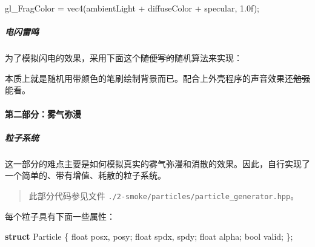 \documentclass[
]{article}
\newenvironment{Shaded}{}{}
\newcommand{\BuiltInTok}[1]{#1}
\newcommand{\CommentTok}[1]{\textcolor[rgb]{0.38,0.63,0.69}{\textit{#1}}}
\newcommand{\ControlFlowTok}[1]{\textcolor[rgb]{0.00,0.44,0.13}{\textbf{#1}}}
\newcommand{\DataTypeTok}[1]{\textcolor[rgb]{0.56,0.13,0.00}{#1}}
\newcommand{\DecValTok}[1]{\textcolor[rgb]{0.25,0.63,0.44}{#1}}
\newcommand{\FloatTok}[1]{\textcolor[rgb]{0.25,0.63,0.44}{#1}}
\newcommand{\KeywordTok}[1]{\textcolor[rgb]{0.00,0.44,0.13}{\textbf{#1}}}
\newcommand{\NormalTok}[1]{#1}
\begin{document}
\begin{Shaded}
\begin{Highlighting}[]
\NormalTok{gl_FragColor = vec4(ambientLight + diffuseColor + specular, }\FloatTok{1.0}\BuiltInTok{f}\NormalTok{);}
\end{Highlighting}
\end{Shaded}

\hypertarget{header-n159}{%
\subparagraph{电闪雷鸣}\label{header-n159}}

为了模拟闪电的效果，采用下面这个\sout{随便写的}随机算法来实现：

\begin{Shaded}
\end{Shaded}

本质上就是随机用带颜色的笔刷绘制背景而已。配合上外壳程序的声音效果还\sout{勉强}能看。

\hypertarget{header-n163}{%
\paragraph{第二部分：雾气弥漫}\label{header-n163}}

\hypertarget{header-n164}{%
\subparagraph{粒子系统}\label{header-n164}}

这一部分的难点主要是如何模拟真实的雾气弥漫和消散的效果。因此，自行实现了一个简单的、带有增值、耗散的粒子系统。

\begin{quote}
此部分代码参见文件
\texttt{./2-smoke/particles/particle\_generator.hpp}。
\end{quote}

每个粒子具有下面一些属性：

\begin{Shaded}
\begin{Highlighting}[]
\KeywordTok{struct}\NormalTok{ Particle \{}
    \DataTypeTok{float}\NormalTok{ posx, posy;}
    \DataTypeTok{float}\NormalTok{ spdx, spdy;}
    \DataTypeTok{float}\NormalTok{ alpha;}
    \DataTypeTok{bool}\NormalTok{  valid;}
\NormalTok{\};}
\end{Highlighting}
\end{Shaded}
\end{document}

